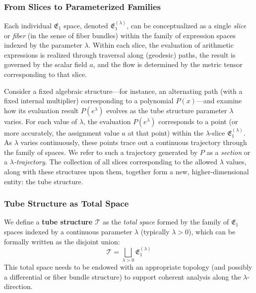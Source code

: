 \subsubsection{From Slices to Parameterized Families}\label{subsec:tube_slices}

Each individual $\mathfrak{E}_1$ space, denoted $\mathfrak{E}_1^{(\lambda)}$, can be conceptualized as a single \emph{slice} or \emph{fiber} (in the sense of fiber bundles) within the family of expression spaces indexed by the parameter $\lambda$. Within each slice, the evaluation of arithmetic expressions is realized through traversal along (geodesic) paths, the result is governed by the scalar field $a$, and the flow is determined by the metric tensor corresponding to that slice.

Consider a fixed algebraic structure—for instance, an alternating path (with a fixed internal multiplier) corresponding to a polynomial $P(x)$—and examine how its evaluation result $P(e^\lambda)$ evolves as the tube structure parameter $\lambda$ varies. For each value of $\lambda$, the evaluation $P(e^\lambda)$ corresponds to a point (or more accurately, the assignment value $a$ at that point) within the $\lambda$-slice $\mathfrak{E}_1^{(\lambda)}$. As $\lambda$ varies continuously, these points trace out a continuous trajectory through the family of spaces. We refer to such a trajectory generated by $P$ as a \emph{section} or a \emph{$\lambda$-trajectory}. The collection of all slices corresponding to the allowed $\lambda$ values, along with these structures upon them, together form a new, higher-dimensional entity: the tube structure.

\subsubsection{Tube Structure as Total Space}\label{subsec:tube_total_space}

We define a \textbf{tube structure $\mathcal{T}$} as the \emph{total space} formed by the family of $\mathfrak{E}_1$ spaces indexed by a continuous parameter $\lambda$ (typically $\lambda > 0$), which can be formally written as the disjoint union:
\begin{equation}
\mathcal{T} = \bigsqcup_{\lambda > 0} \mathfrak{E}_1^{(\lambda)}
\end{equation}
This total space needs to be endowed with an appropriate topology (and possibly a differential or fiber bundle structure) to support coherent analysis along the $\lambda$-direction.

